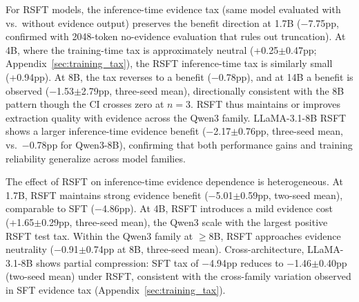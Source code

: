 For RSFT models, the inference-time evidence tax (same model evaluated with vs.\ without evidence output) preserves the benefit direction at 1.7B ($-$7.75pp, confirmed with 2048-token no-evidence evaluation that rules out truncation). At 4B, where the training-time tax is approximately neutral (+0.25$\pm$0.47pp; Appendix~\ref{sec:training_tax}), the RSFT inference-time tax is similarly small (+0.94pp). At 8B, the tax reverses to a benefit ($-$0.78pp), and at 14B a benefit is observed ($-$1.53$\pm$2.79pp, three-seed mean), directionally consistent with the 8B pattern though the CI crosses zero at $n{=}3$. RSFT thus maintains or improves extraction quality with evidence across the Qwen3 family. LLaMA-3.1-8B RSFT shows a larger inference-time evidence benefit ($-$2.17$\pm$0.76pp, three-seed mean, vs.\ $-$0.78pp for Qwen3-8B), confirming that both performance gains and training reliability generalize across model families.

The effect of RSFT on inference-time evidence dependence is heterogeneous. At 1.7B, RSFT maintains strong evidence benefit ($-$5.01$\pm$0.59pp, two-seed mean), comparable to SFT ($-$4.86pp). At 4B, RSFT introduces a mild evidence cost (+1.65$\pm$0.29pp, three-seed mean), the Qwen3 scale with the largest positive RSFT test tax. Within the Qwen3 family at $\geq$8B, RSFT approaches evidence neutrality ($-$0.91$\pm$0.74pp at 8B, three-seed mean). Cross-architecture, LLaMA-3.1-8B shows partial compression: SFT tax of $-$4.94pp reduces to $-$1.46$\pm$0.40pp (two-seed mean) under RSFT, consistent with the cross-family variation observed in SFT evidence tax (Appendix~\ref{sec:training_tax}).


